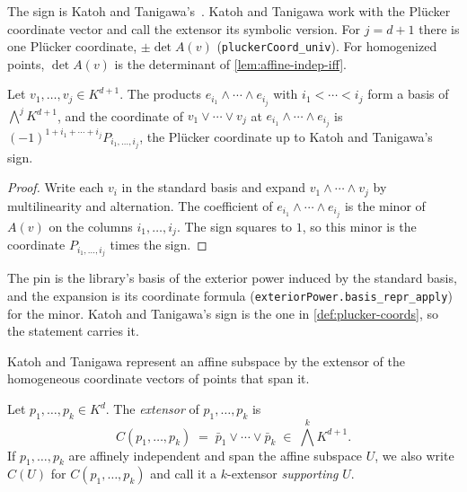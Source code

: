 The sign is Katoh and Tanigawa's~\cite[p.~651]{katohTanigawa2011}.
Katoh and Tanigawa work with the Plücker coordinate vector and call the
extensor its symbolic version. For $j = d+1$ there is one Plücker
coordinate, $\pm \det A(v)$ (\texttt{pluckerCoord\_univ}). For
homogenized points, $\det A(v)$ is the determinant of
\cref{lem:affine-indep-iff}.

\begin{lemma}
  \label{lem:plucker-expansion}
  \leanok
  Let $v_1, \dots, v_j \in K^{d+1}$. The products
  $e_{i_1} \wedge \cdots \wedge e_{i_j}$ with $i_1 < \cdots < i_j$ form
  a basis of $\bigwedge^j K^{d+1}$, and the coordinate of
  $v_1 \vee \cdots \vee v_j$ at $e_{i_1} \wedge \cdots \wedge e_{i_j}$
  is $(-1)^{1 + i_1 + \cdots + i_j} P_{i_1, \dots, i_j}$, the Plücker
  coordinate up to Katoh and Tanigawa's sign.
\end{lemma}
\begin{proof}
  \leanok
  Write each $v_i$ in the standard basis and expand
  $v_1 \wedge \cdots \wedge v_j$ by multilinearity and alternation. The
  coefficient of $e_{i_1} \wedge \cdots \wedge e_{i_j}$ is the minor of
  $A(v)$ on the columns $i_1, \dots, i_j$. The sign squares to $1$, so
  this minor is the coordinate $P_{i_1, \dots, i_j}$ times the sign.
\end{proof}

\begin{fmlnote}
  The pin is the library's basis of the exterior power induced by the
  standard basis, and the expansion is its coordinate formula
  (\texttt{exteriorPower.basis\_repr\_apply}) for the minor. Katoh and
  Tanigawa's sign is the one in \cref{def:plucker-coords}, so the
  statement carries it.
\end{fmlnote}

Katoh and Tanigawa represent an affine subspace by the extensor of the
homogeneous coordinate vectors of points that span it.

\begin{definition}
  \label{def:affine-subspace-extensor}
  \leanok
  Let $p_1, \dots, p_k \in K^d$. The \emph{extensor} of
  $p_1, \dots, p_k$ is
  \[
    C(p_1, \dots, p_k) \;=\; \bar p_1 \vee \cdots \vee \bar p_k
    \;\in\; \textstyle\bigwedge^k K^{d+1}.
  \]
  If $p_1, \dots, p_k$ are affinely independent and span the affine
  subspace $U$, we also write $C(U)$ for $C(p_1, \dots, p_k)$ and call
  it a $k$-extensor \emph{supporting} $U$.
\end{definition}

